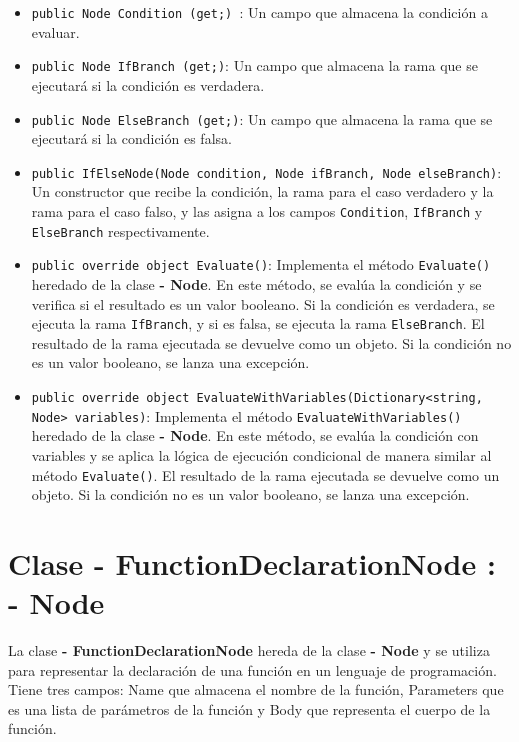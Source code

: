 \documentclass{article}
\newcommand{\subclassed}[1]{\textcolor{classcolor}{\textbf{- #1}}}
\begin{document}
\begin{itemize}
    \item \lstinline{public Node Condition (get;) }: Un campo que almacena la condición a evaluar.

    \item \lstinline{public Node IfBranch (get;)}: Un campo que almacena la rama que se ejecutará si la condición es verdadera.

    \item \lstinline{public Node ElseBranch (get;)}: Un campo que almacena la rama que se ejecutará si la condición es falsa.

    \item \lstinline{public IfElseNode(Node condition, Node ifBranch, Node elseBranch)}: Un constructor que recibe la condición, la rama para el caso verdadero y la rama para el caso falso, y las asigna a los campos \lstinline{Condition}, \lstinline{IfBranch} y \lstinline{ElseBranch} respectivamente.

    \item \lstinline{public override object Evaluate()}: Implementa el método \lstinline{Evaluate()} heredado de la clase \subclassed{Node}. En este método, se evalúa la condición y se verifica si el resultado es un valor booleano. Si la condición es verdadera, se ejecuta la rama \lstinline{IfBranch}, y si es falsa, se ejecuta la rama \lstinline{ElseBranch}. El resultado de la rama ejecutada se devuelve como un objeto. Si la condición no es un valor booleano, se lanza una excepción.

    \item \lstinline{public override object EvaluateWithVariables(Dictionary<string, Node> variables)}: Implementa el método \lstinline{EvaluateWithVariables()} heredado de la clase \subclassed{Node}. En este método, se evalúa la condición con variables y se aplica la lógica de ejecución condicional de manera similar al método \lstinline{Evaluate()}. El resultado de la rama ejecutada se devuelve como un objeto. Si la condición no es un valor booleano, se lanza una excepción.
\end{itemize}
\section{Clase \subclassed{FunctionDeclarationNode} : \subclassed{Node}}

La clase \subclassed{FunctionDeclarationNode} hereda de la clase \subclassed{Node} y se utiliza para representar la declaración de una función en un lenguaje de programación. Tiene tres campos: \textcolor{fieldcolor}{Name} que almacena el nombre de la función, \textcolor{fieldcolor}{Parameters} que es una lista de parámetros de la función y \textcolor{fieldcolor}{Body} que representa el cuerpo de la función.
\end{document}
